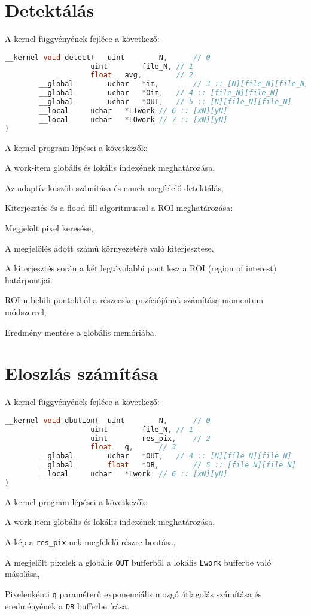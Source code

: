 \section{Detektálás}
\noindent A kernel függvényének fejléce a következő:
\begin{lstlisting}[language=C++]
__kernel void detect(	uint		N,		// 0
					uint		file_N,	// 1					
					float	avg,		// 2
		__global		uchar	*im,		// 3 :: [N][file_N][file_N]
		__global		uchar	*Oim,	// 4 :: [file_N][file_N]
		__global		uchar	*OUT,	// 5 :: [N][file_N][file_N]
		__local		uchar	*LIwork	// 6 :: [xN][yN]
		__local		uchar	*LOwork	// 7 :: [xN][yN]
)
\end{lstlisting}

\noindent A kernel program lépései a következők:
	\begin{enumerate*}
		\item A work-item globális és lokális indexének meghatározása,
		\item Az adaptív küszöb számítása és ennek megfelelő detektálás,
		\item Kiterjesztés és a flood-fill algoritmussal a ROI meghatározása:
		\begin{enumerate*}
			\item Megjelölt pixel keresése,
			\item A megjelölés adott számú környezetére való kiterjesztése,
			\item A kiterjesztés során a két legtávolabbi pont lesz a ROI (region of interest) határpontjai.
		\end{enumerate*}
		\item ROI-n belüli pontokból a részecske pozíciójának számítása momentum módszerrel,
		\item Eredmény mentése a globális memóriába.
	\end{enumerate*}
	
\section{Eloszlás számítása}
\noindent A kernel függvényének fejléce a következő:
\begin{lstlisting}[language=C++]
__kernel void dbution(	uint		N,		// 0
					uint		file_N,	// 1
					uint		res_pix,	// 2
					float	q,		// 3
		__global		uchar	*OUT,	// 4 :: [N][file_N][file_N]
		__global		float	*DB,		// 5 :: [file_N][file_N]
		__local		uchar	*Lwork	// 6 :: [xN][yN]
)
\end{lstlisting}

\noindent A kernel program lépései a következők:
	\begin{enumerate*}
		\item A work-item globális és lokális indexének meghatározása,
		\item A kép a \texttt{res\_pix}-nek megfelelő részre bontása,
		\item A megjelölt pixelek a globális \texttt{OUT} bufferből a lokális \texttt{Lwork} bufferbe való másolása,
		\item Pixelenkénti \texttt{q} paraméterű exponenciális mozgó átlagolás számítása és eredményének a \texttt{DB} bufferbe írása. 
	\end{enumerate*}
	
	
	
